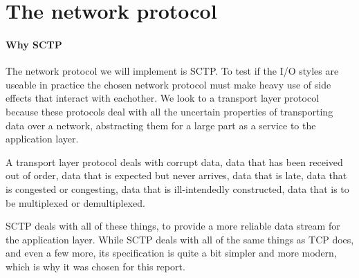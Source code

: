 \section{The network protocol}
\paragraph{Why SCTP}
The network protocol we will implement is SCTP.
To test if the I/O styles are useable in practice the chosen network protocol must make heavy use of side effects that interact with eachother.
We look to a transport layer protocol because these protocols deal with all the uncertain properties of transporting data over a network, abstracting them for a large part as a service to the application layer.

A transport layer protocol deals with corrupt data, data that has been received out of order, data that is expected but never arrives, data that is late, data that is congested or congesting, data that is ill-intendedly constructed, data that is to be multiplexed or demultiplexed.

SCTP deals with all of these things, to provide a more reliable data stream for the application layer.
While SCTP deals with all of the same things as TCP does, and even a few more, its specification is quite a bit simpler and more modern, which is why it was chosen for this report.
